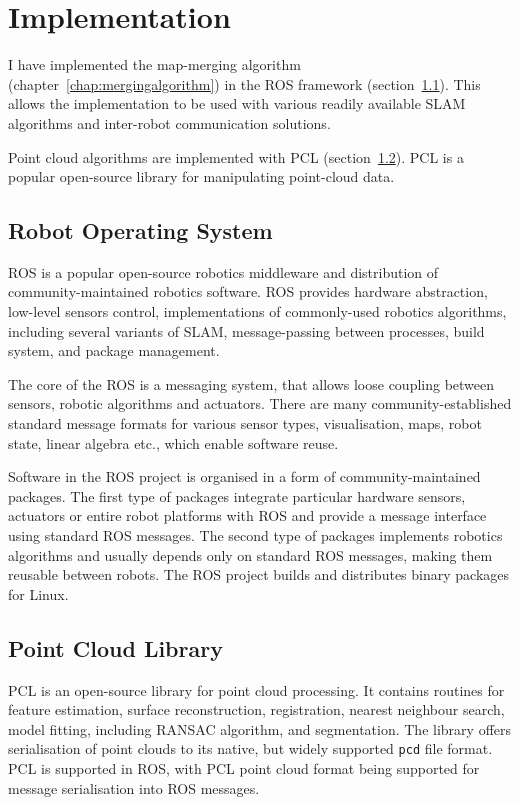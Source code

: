 \chapter{Implementation}
\label{chap:implementation}

I have implemented the map-merging algorithm (chapter~\ref{chap:mergingalgorithm}) in the \gls{ROS} framework (section~\ref{sec:ros}). This allows the implementation to be used with various readily available \gls{SLAM} algorithms and inter-robot communication solutions.

Point cloud algorithms are implemented with \gls{PCL} (section~\ref{sec:pcl}). \gls{PCL} is a popular open-source library for manipulating point-cloud data.

\section{Robot Operating System}
\label{sec:ros}

\gls{ROS} is a popular open-source robotics middleware and distribution of community-maintained robotics software. \gls{ROS} provides hardware abstraction, low-level sensors control, implementations of commonly-used robotics algorithms, including several variants of \gls{SLAM}, message-passing between processes, build system, and package management.

The core of the \gls{ROS} is a messaging system, that allows loose coupling between sensors, robotic algorithms and actuators. There are many community-established standard message formats for various sensor types, visualisation, maps, robot state, linear algebra etc., which enable software reuse.

Software in the \gls{ROS} project is organised in a form of community-maintained packages. The first type of packages integrate particular hardware sensors, actuators or entire robot platforms with \gls{ROS} and provide a message interface using standard \gls{ROS} messages. The second type of packages implements robotics algorithms and usually depends only on standard \gls{ROS} messages, making them reusable between robots. The \gls{ROS} project builds and distributes binary packages for Linux.

\section{Point Cloud Library}
\label{sec:pcl}

\gls{PCL} is an open-source library for point cloud processing. It contains routines for feature estimation, surface reconstruction, registration, nearest neighbour search, model fitting, including \gls{RANSAC} algorithm, and segmentation. The library offers serialisation of point clouds to its native, but widely supported \texttt{pcd} file format. \Gls{PCL} is supported in \gls{ROS}, with \gls{PCL} point cloud format being supported for message serialisation into \gls{ROS} messages.


